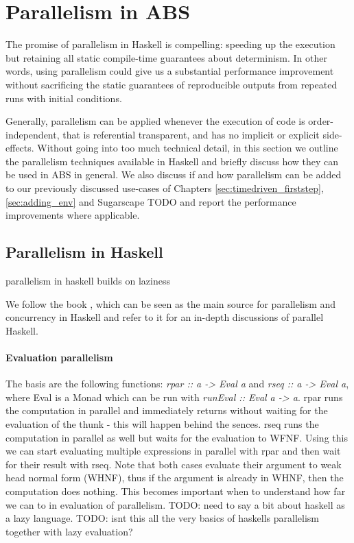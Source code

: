 \section{Parallelism in ABS}
The promise of parallelism in Haskell is compelling: speeding up the execution but retaining all static compile-time guarantees about determinism. In other words, using parallelism could give us a substantial performance improvement without sacrificing the static guarantees of reproducible outputs from repeated runs with initial conditions.

Generally, parallelism can be applied whenever the execution of code is order-independent, that is referential transparent, and has no implicit or explicit side-effects. Without going into too much technical detail, in this section we outline the parallelism techniques available in Haskell and briefly discuss how they can be used in ABS in general. We also discuss if and how parallelism can be added to our previously discussed use-cases of Chapters \ref{sec:timedriven_firststep}, \ref{sec:adding_env} and Sugarscape TODO and report the performance improvements where applicable.

\subsection{Parallelism in Haskell}
parallelism in haskell builds on laziness

We follow the book \cite{marlow_parallel_2013}, which can be seen as the main source for parallelism and concurrency in Haskell and refer to it for an in-depth discussions of parallel Haskell.

\paragraph{Evaluation parallelism}
The basis are the following functions: \textit{rpar :: a -> Eval a} and \textit{rseq :: a -> Eval a}, where Eval is a Monad which can be run with \textit{runEval :: Eval a -> a}. rpar runs the computation in parallel and immediately returns without waiting for the evaluation of the thunk - this will happen behind the sences. rseq runs the computation in parallel as well but waits for the evaluation to WFNF. Using this we can start evaluating multiple expressions in parallel with rpar and then wait for their result with rseq. Note that both cases evaluate their argument to weak head normal form (WHNF), thus if the argument is already in WHNF, then the computation does nothing. This becomes important when to understand how far we can to in evaluation of parallelism. TODO: need to say a bit about haskell as a lazy language. TODO: isnt this all the very basics of haskells parallelism together with lazy evaluation?

